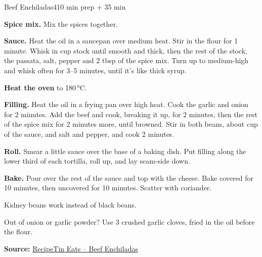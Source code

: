 \begin{recipebox}{Beef Enchiladas}{4}{10 min prep + 35 min}
\begin{method}
  \item \textbf{Spice mix.} Mix the spices together.
  \item \textbf{Sauce.} Heat the oil in a saucepan over medium heat. Stir in the flour
        for 1 minute. Whisk in  cup stock until smooth and thick, then
        the rest of the stock, the passata, salt, pepper and 2 tbsp of the spice
        mix. Turn up to medium-high and whisk often for 3--5 minutes, until it's like
        thick syrup.
  \item \textbf{Heat the oven} to 180\,°C.
  \item \textbf{Filling.} Heat the oil in a frying pan over high heat. Cook the garlic
        and onion for 2 minutes. Add the beef and cook, breaking it up, for 2
        minutes, then the rest of the spice mix for 2 minutes more, until browned.
        Stir in both beans, about  cup of the sauce, and salt and
        pepper, and cook 2 minutes.
  \item \textbf{Roll.} Smear a little sauce over the base of a baking dish. Put filling
        along the lower third of each tortilla, roll up, and lay seam-side down.
  \item \textbf{Bake.} Pour over the rest of the sauce and top with the cheese. Bake
        covered for 10 minutes, then uncovered for 10 minutes. Scatter with coriander.
\end{method}

\begin{notelist}
  \item Kidney beans work instead of black beans.
  \item Out of onion or garlic powder? Use 3 crushed garlic cloves, fried in the oil
        before the flour.
\end{notelist}

\noindent\textbf{Source:} \href{https://www.recipetineats.com/beef-enchiladas/}{RecipeTin Eats -- Beef Enchiladas}

\end{recipebox}
